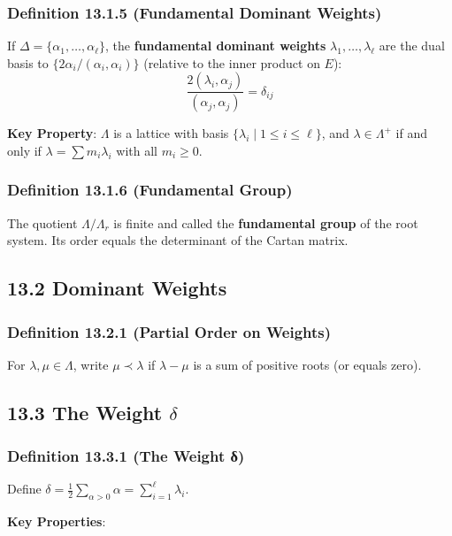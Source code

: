 \subsubsection{Definition 13.1.5 (Fundamental Dominant Weights)}

If $\Delta = \{\alpha_1, \ldots, \alpha_\ell\}$, the \textbf{fundamental dominant weights} $\lambda_1, \ldots, \lambda_\ell$ are the dual basis to $\{2\alpha_i/(\alpha_i, \alpha_i)\}$ (relative to the inner product on $E$):
\[
\frac{2(\lambda_i, \alpha_j)}{(\alpha_j, \alpha_j)} = \delta_{ij}
\]

\textbf{Key Property}: $\Lambda$ is a lattice with basis $\{\lambda_i \mid 1 \leq i \leq \ell\}$, and $\lambda \in \Lambda^+$ if and only if $\lambda = \sum m_i \lambda_i$ with all $m_i \geq 0$.

\subsubsection{Definition 13.1.6 (Fundamental Group)}

The quotient $\Lambda/\Lambda_r$ is finite and called the \textbf{fundamental group} of the root system. Its order equals the determinant of the Cartan matrix.

\subsection{13.2 Dominant Weights}

\subsubsection{Definition 13.2.1 (Partial Order on Weights)}

For $\lambda, \mu \in \Lambda$, write $\mu \prec \lambda$ if $\lambda - \mu$ is a sum of positive roots (or equals zero).

\subsection{13.3 The Weight \texorpdfstring{$\delta$}{delta}}

\subsubsection{Definition 13.3.1 (The Weight δ)}

Define $\delta = \frac{1}{2}\sum_{\alpha>0} \alpha = \sum_{i=1}^\ell \lambda_i$.

\textbf{Key Properties}:

